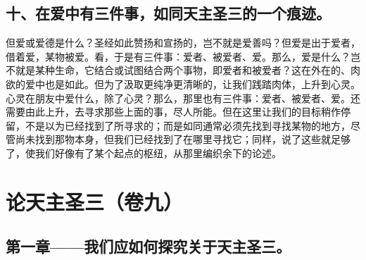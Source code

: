 \subsection{十、在爱中有三件事，如同天主圣三的一个痕迹。}

但爱或爱德是什么？圣经如此赞扬和宣扬的，岂不就是爱善吗？但爱是出于爱者，借着爱，某物被爱。看，于是有三件事：爱者、被爱者、爱。那么，爱是什么？岂不就是某种生命，它结合或试图结合两个事物，即爱者和被爱者？这在外在的、肉欲的爱中也是如此。但为了汲取更纯净更清晰的，让我们践踏肉体，上升到心灵。心灵在朋友中爱什么，除了心灵？那么，那里也有三件事：爱者、被爱者、爱。还需要由此上升，去寻求那些上面的事，尽人所能。但在这里让我们的目标稍作停留，不是以为已经找到了所寻求的；而是如同通常必须先找到寻找某物的地方，尽管尚未找到那物本身，但我们已经找到了在哪里寻找它；同样，说了这些就足够了，使我们好像有了某个起点的枢纽，从那里编织余下的论述。\par



\section{论天主圣三（卷九）}

\par


\subsection{第一章——我们应如何探究关于天主圣三。}

